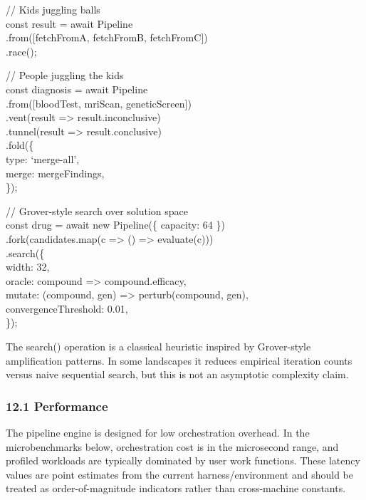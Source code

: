 \documentclass[
]{article}
\begin{document}
// Kids juggling balls\\
const result = await Pipeline\\
.from({[}fetchFromA, fetchFromB, fetchFromC{]})\\
.race();

// People juggling the kids\\
const diagnosis = await Pipeline\\
.from({[}bloodTest, mriScan, geneticScreen{]})\\
.vent(result =\textgreater{} result.inconclusive)\\
.tunnel(result =\textgreater{} result.conclusive)\\
.fold(\{\\
type: `merge-all',\\
merge: mergeFindings,\\
\});

// Grover-style search over solution space\\
const drug = await new Pipeline(\{ capacity: 64 \})\\
.fork(candidates.map(c =\textgreater{} () =\textgreater{}
evaluate(c)))\\
.search(\{\\
width: 32,\\
oracle: compound =\textgreater{} compound.efficacy,\\
mutate: (compound, gen) =\textgreater{} perturb(compound, gen),\\
convergenceThreshold: 0.01,\\
\});

The search() operation is a classical heuristic inspired by Grover-style
amplification patterns. In some landscapes it reduces empirical
iteration counts versus naive sequential search, but this is not an
asymptotic complexity claim.

\subsubsection{\texorpdfstring{\textbf{12.1
Performance}}{12.1 Performance}}\label{performance}

The pipeline engine is designed for low orchestration overhead. In the
microbenchmarks below, orchestration cost is in the microsecond range,
and profiled workloads are typically dominated by user work functions.
These latency values are point estimates from the current
harness/environment and should be treated as order-of-magnitude
indicators rather than cross-machine constants.
\end{document}
